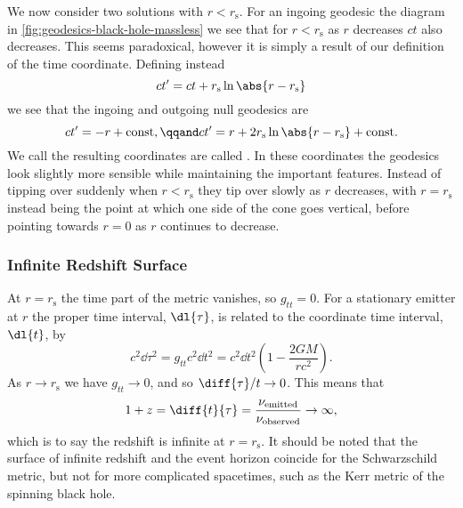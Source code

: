 \documentclass[fleqn]{NotesClass}
\begin{document}
    We now consider two solutions with \(r < r_{\mathrm{s}}\).
    For an ingoing geodesic the diagram in \cref{fig:geodesics-black-hole-massless} we see that for \(r < r_{\mathrm{s}}\) as \(r\) decreases \(ct\) also decreases.
    This seems paradoxical, however it is simply a result of our definition of the time coordinate.
    Defining instead
    \begin{equation}
        ct' = ct + r_{\mathrm{s}} \ln\abs{r - r_{\mathrm{s}}}
    \end{equation}
    we see that the ingoing and outgoing null geodesics are
    \begin{equation}
        ct' = -r + \mathrm{const}, \qqand ct' = r + 2r_{\mathrm{s}} \ln\abs{r - r_{\mathrm{s}}} + \mathrm{const}.
    \end{equation}
    We call the resulting coordinates are called .
    In these coordinates the geodesics look slightly more sensible while maintaining the important features.
    Instead of tipping over suddenly when \(r < r_{\mathrm{s}}\) they tip over slowly as \(r\) decreases, with \(r = r_{\mathrm{s}}\) instead being the point at which one side of the cone goes vertical, before pointing towards \(r = 0\) as \(r\) continues to decrease.
    
    \subsubsection{Infinite Redshift Surface}
    At \(r = r_{\mathrm{s}}\) the time part of the metric vanishes, so \(g_{tt} = 0\).
    For a stationary emitter at \(r\) the proper time interval, \(\dl{\tau}\), is related to the coordinate time interval, \(\dl{t}\), by
    \begin{equation}
        c^2\dd{\tau}^2 = g_{tt}c^2\dd{t}^2 = c^2\dd{t}^2\left( 1 - \frac{2GM}{rc^2} \right).
    \end{equation}
    As \(r \to r_{\mathrm{s}}\) we have \(g_{tt} \to 0\), and so \(\diff{\tau}/{t} \to 0\).
    This means that
    \begin{equation}
        1 + z = \diff{t}{\tau} = \frac{\nu_{\mathrm{emitted}}}{\nu_{\mathrm{observed}}} \to \infty,
    \end{equation}
    which is to say the redshift is infinite at \(r = r_{\mathrm{s}}\).
    It should be noted that the surface of infinite redshift and the event horizon coincide for the Schwarzschild metric, but not for more complicated spacetimes, such as the Kerr metric of the spinning black hole.
    
\end{document}
